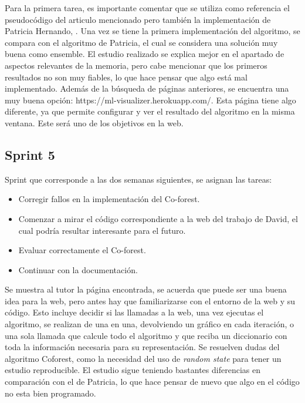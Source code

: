 Para la primera tarea, es importante comentar que se utiliza como referencia el pseudocódigo del articulo mencionado pero también la implementación de Patricia Hernando, \cite{TFG:Patricia}. 
Una vez se tiene la primera implementación del algoritmo, se compara con el algoritmo de Patricia, el cual se considera una solución muy buena como ensemble.
El estudio realizado se explica mejor en el apartado de aspectos relevantes de la memoria, pero cabe mencionar que los primeros resultados no son muy fiables, lo que hace pensar que algo está mal implementado.
Además de la búsqueda de páginas anteriores, se encuentra una muy buena opción: https://ml-visualizer.herokuapp.com/. Esta página tiene algo diferente, ya que permite configurar y ver el resultado del algoritmo en la misma ventana. Este será uno de los objetivos en la web.

\subsection{Sprint 5}
Sprint que corresponde a las dos semanas siguientes, se asignan las tareas:
\begin{itemize}
	\item Corregir fallos en la implementación del Co-forest.
	\item Comenzar a mirar el código correspondiente a la web del trabajo de David, el cual podría resultar interesante para el futuro.
	\item Evaluar correctamente el Co-forest.
	\item Continuar con la documentación.
\end{itemize}

Se muestra al tutor la página encontrada, se acuerda que puede ser una buena idea para la web, pero antes hay que familiarizarse con el entorno de la web y su código. Esto incluye decidir si las llamadas a la web, una vez ejecutas el algoritmo, se realizan de una en una, devolviendo un gráfico en cada iteración, o una sola llamada que calcule todo el algoritmo y que reciba un diccionario con toda la información necesaria para su representación. Se resuelven dudas del algoritmo Coforest, como la necesidad del uso de \textit{random state} para tener un estudio reproducible. El estudio sigue teniendo bastantes diferencias en comparación con el de Patricia, lo que hace pensar de nuevo que algo en el código no esta bien programado.

